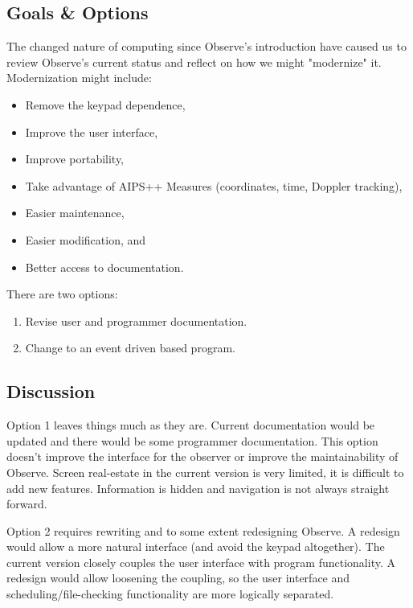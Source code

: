 \subsection{Goals \& Options}

The changed nature of computing since Observe's introduction have caused us
to review Observe's current status and reflect on how we might "modernize" it.
Modernization might include:
\begin{itemize}
\item   Remove the keypad dependence,
\item   Improve the user interface,
\item   Improve portability,
\item   Take advantage of AIPS++ Measures (coordinates, time, Doppler
tracking),
\item   Easier maintenance, 
\item   Easier modification, and 
\item   Better access to documentation.
\end{itemize}

There are two options:
\begin{enumerate}
\item Revise user and programmer documentation.

\item Change to an event driven based program.

\end{enumerate}


\subsection{Discussion}

Option 1 leaves things much as they are.  Current documentation would be
updated and there would be some programmer documentation.  This option doesn't
improve the interface for the observer or improve the maintainability of
Observe.  Screen real-estate in the current version is very limited, it is
difficult to add new features.  Information is hidden and navigation is not
always straight forward.


Option 2 requires rewriting and to some extent redesigning Observe.
A redesign would allow a more natural interface (and avoid the keypad
altogether).  The current version closely couples the user interface with 
program functionality. A redesign would allow loosening the coupling, so
the user interface and scheduling/file-checking functionality are more
logically separated.

